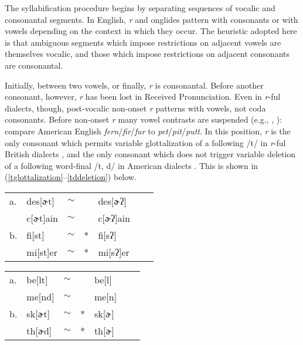 \documentclass[12pt]{article}
\newcommand{\alt}{\ensuremath{\sim}}
\begin{document}
The syllabification procedure begins by separating sequences of vocalic and consonantal segments. In English, \emph{r} and onglides pattern with consonants or with vowels depending on the context in which they occur. The heuristic adopted here is that ambiguous segments which impose restrictions on adjacent vowels are themselves vocalic, and those which impose restrictions on adjacent consonants are consonantal.

Initially, between two vowels, or finally, \emph{r} is consonantal. Before another consonant, however, \emph{r} has been lost in Received Pronunciation. Even in \emph{r}-ful dialects, though, post-vocalic non-onset \emph{r} patterns with vowels, not coda consonants. Before non-onset \emph{r} many vowel contrasts are suspended (e.g., \citealp[269f.]{Fudge1969}, \citealp[][255]{Harris1994}): compare American English \emph{fern}/\emph{fir}/\emph{fur} to \emph{pet}/\emph{pit}/\emph{putt}. In this position, \emph{r} is the only consonant which permits variable glottalization of a following /t/ in \emph{r}-ful British dialects \citep[258]{Harris1994}, and the only consonant which does not trigger variable deletion of a following word-final /t, d/ in American dialects \citep[8]{Guy1980}. This is shown in (\ref{tglottalization}--\ref{tddeletion}) below.

\begin{example}
\label{tglottalization}
\begin{tabular}{l l l l@{} l l l}
a. & {des}[ɚt]    & \alt{} &   & {des}[ɚʔ]    \\
   & {c}[ɚt]{ain} & \alt{} &   & {c}[ɚʔ]{ain} \\
b. & {fi}[st]     & \alt{} & * & {fi}[sʔ]     \\
   & {mi}[st]{er} & \alt{} & * & {mi}[sʔ]{er} \\
\end{tabular}
\end{example}

\begin{example}
\label{tddeletion}
\begin{tabular}{l l l l@{} l l l}
a. & {be}[lt] & \alt{} &   & {be}[l] \\
   & {me}[nd] & \alt{} &   & {me}[n] \\
b. & {sk}[ɚt] & \alt{} & * & {sk}[ɚ] \\
   & {th}[ɚd] & \alt{} & * & {th}[ɚ] \\
\end{tabular}
\end{example}
\end{document}
